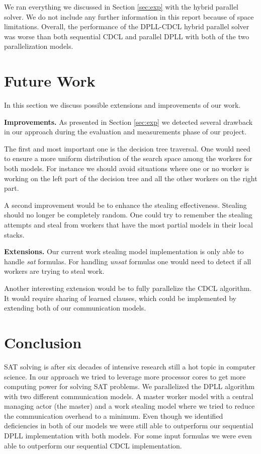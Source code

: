 \documentclass[letterpaper]{article}
\newcommand{\mypar}[1]{{\bf #1.}}
\begin{document}
We ran everything we discussed in Section \ref{sec:exp} with the hybrid parallel solver.
We do not include any further information in this report because of space limitations.
Overall, the performance of the DPLL-CDCL hybrid parallel solver was worse than both sequential CDCL and parallel DPLL with both of the two parallelization models.

\section{Future Work}\label{sec:futureWork}
In this section we discuss possible extensions and improvements of our work.

\mypar{Improvements}
As presented in Section \ref{sec:exp} we detected several drawback in our approach during the evaluation and measurements phase of our project.

The first and most important one is the decision tree traversal.
One would need to ensure a more uniform distribution of the search space among the workers for both models.
For instance we should avoid situations where one or no worker is working on the left part of the decision tree and all the other workers on the right part.

A second improvement would be to enhance the stealing effectiveness.
Stealing should no longer be completely random.
One could try to remember the stealing attempts and steal from workers that have the most partial models in their local stacks.

\mypar{Extensions}
Our current work stealing model implementation is only able to handle \textit{sat} formulas.
For handling \textit{unsat} formulas one would need to detect if all workers are trying to steal work.

Another interesting extension would be to fully parallelize the CDCL algorithm.
It would require sharing of learned clauses, which could be implemented by extending both of our communication models.

\section{Conclusion}\label{sec:conclusion}
SAT solving is after six decades of intensive research still a hot topic in computer science.
In our approach we tried to leverage more processor cores to get more computing power for solving SAT problems.
We parallelized the DPLL algorithm with two different communication models.
A master worker model with a central managing actor (the master) and a work stealing model where we tried to reduce the communication overhead to a minimum.
Even though we identified deficiencies in both of our models we were still able to outperform our sequential DPLL implementation with both models.
For some input formulas we were even able to outperform our sequential CDCL implementation.
\end{document}
